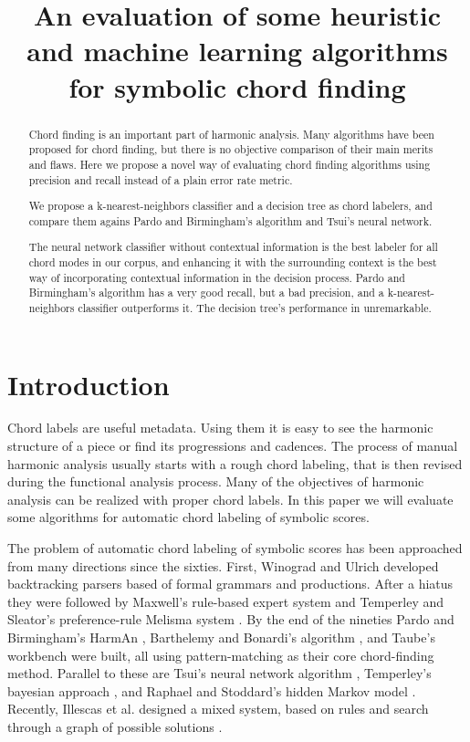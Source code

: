 \documentclass{article}
\title{An evaluation of some heuristic and machine learning algorithms for
  symbolic chord finding} \oneauthor {}{}
\begin{document}
\graphicspath{{figs/}{data/}}
\maketitle

\begin{abstract}

  Chord finding is an important part of harmonic analysis. Many
  algorithms have been proposed for chord finding, but there is no
  objective comparison of their main merits and flaws. Here we propose
  a novel way of evaluating chord finding algorithms using precision
  and recall instead of a plain error rate metric.
  
  We propose a k-nearest-neighbors classifier and a decision tree as
  chord labelers, and compare them agains Pardo and Birmingham's
  algorithm and Tsui's neural network.
  
  The neural network classifier without contextual information is the
  best labeler for all chord modes in our corpus, and enhancing it
  with the surrounding context is the best way of incorporating
  contextual information in the decision process. Pardo and
  Birmingham's algorithm has a very good recall, but a bad precision,
  and a k-nearest-neighbors classifier outperforms it. The decision
  tree's performance in unremarkable.


\end{abstract}

\section{Introduction}
\label{sec:introduction}

Chord labels are useful metadata. Using them it is easy to see the
harmonic structure of a piece or find its progressions and
cadences. The process of manual harmonic analysis usually starts with
a rough chord labeling, that is then revised during the functional
analysis process. Many of the objectives of harmonic analysis can be
realized with proper chord labels. In this paper we will evaluate some
algorithms for automatic chord labeling of symbolic scores.

The problem of automatic chord labeling of symbolic scores has been
approached from many directions since the sixties. First, Winograd
\cite{winograd:linguistics} and Ulrich \cite{ulrich:analysis}
developed backtracking parsers based of formal grammars and
productions. After a hiatus they were followed by Maxwell's
\cite{maxwell:expert} rule-based expert system and Temperley and
Sleator's preference-rule Melisma system
\cite{temperley.ea:modeling}. By the end of the nineties Pardo and
Birmingham's HarmAn \cite{pardo.ea:algorithms}, Barthelemy and
Bonardi's algorithm \cite{barthelemy.ea:figured}, and Taube's
workbench \cite{taube:automatic} were built, all using
pattern-matching as their core chord-finding method. Parallel to these
are Tsui's neural network algorithm \cite{tsui:harmonic}, Temperley's
bayesian approach \cite{temperley:bayesian}, and Raphael and
Stoddard's hidden Markov model \cite{raphael.ea:harmonic}. Recently,
Illescas et al. designed a mixed system, based on rules and search
through a graph of possible solutions \cite{illescas.ea:harmonic}.
\end{document}
